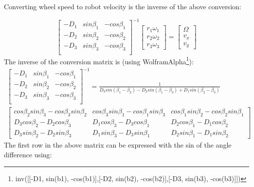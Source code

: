 \documentclass[a4paper]{paper}
\begin{document}
Converting wheel speed to robot velocity is the inverse of the above conversion:

\begin{equation}
    \begin{bmatrix}
        - D_1 & sin \beta_1 & - cos \beta_1 \\
        - D_2 & sin \beta_2 & - cos \beta_2 \\
        - D_3 & sin \beta_3 & - cos \beta_3 \\
    \end{bmatrix}^{-1}
    \begin{bmatrix} r_1 \omega_1 \\ r_2 \omega_2 \\ r_3 \omega_3 \end{bmatrix}
    = \begin{bmatrix}
        \Omega \\ v_x \\ v_y
    \end{bmatrix}
\end{equation}
The inverse of the conversion matrix is (using WolframAlpha\footnote{
inv([[-D1, sin(b1), -cos(b1)],[-D2, sin(b2), -cos(b2)],[-D3, sin(b3), -cos(b3)]])
}):
\begin{multline}
    \begin{bmatrix}
        - D_1 & sin \beta_1 & - cos \beta_1 \\
        - D_2 & sin \beta_2 & - cos \beta_2 \\
        - D_3 & sin \beta_3 & - cos \beta_3 \\
    \end{bmatrix}^{-1}
    = \frac{1}{D_3 sin(\beta_1-\beta_2)
        -D_2 sin(\beta_1-\beta_3)
        +D_1 sin(\beta_2-\beta_3)}
    \\
    \begin{bmatrix}
        cos \beta_2 sin \beta_3-cos \beta_3 sin \beta_2
            & cos \beta_3 sin \beta_1-cos \beta_1 sin \beta_3
            & cos \beta_1 sin \beta_2-cos \beta_2 sin \beta_1\\
        D_3 cos \beta_2-D_2 cos \beta_3
            & D_1 cos \beta_3-D_3 cos \beta_1
            & D_2 cos \beta_1-D_1 cos \beta_2\\
        D_3 sin \beta_2-D_2 sin \beta_3
            & D_1 sin \beta_3-D_3 sin \beta_1
            & D_2 sin \beta_1-D_1 sin \beta_2
    \end{bmatrix}
\end{multline}
The first row in the above matrix can be expressed
with the sin of the angle difference using:
\end{document}
